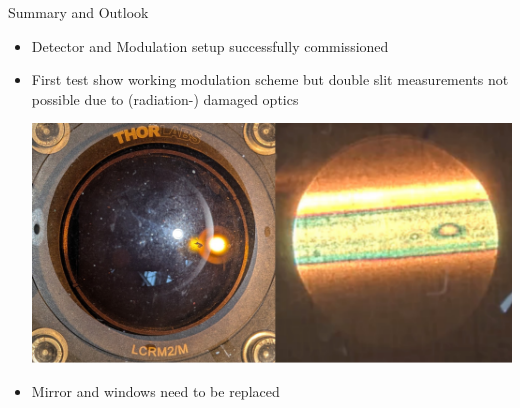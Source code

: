 \documentclass[english]{article}
\def\boxheight{200mm}
\begin{document}
\begin{boxgrayw}[\boxheight]{Summary and Outlook}{}
	\begin{itemize}
		\item Detector and Modulation setup successfully commissioned
		\item First test show working modulation scheme but double slit measurements not possible due to (radiation-) damaged optics
		
		\vspace{5mm}
		\includegraphics[width=150mm]{img/mirrorAndWindow.png}
		\item Mirror and windows need to be replaced
	\end{itemize}
\end{boxgrayw}

	
\end{document}
